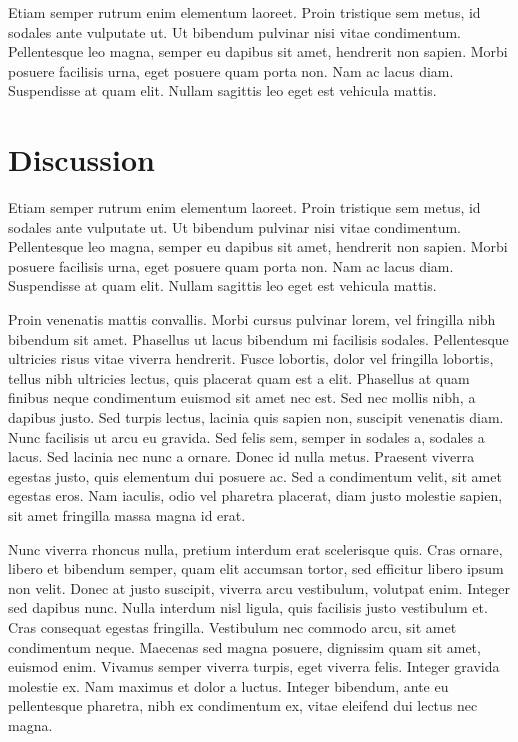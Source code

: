 Etiam semper rutrum enim elementum laoreet. Proin tristique sem metus, id sodales ante vulputate ut. Ut bibendum pulvinar nisi vitae condimentum. Pellentesque leo magna, semper eu dapibus sit amet, hendrerit non sapien. Morbi posuere facilisis urna, eget posuere quam porta non. Nam ac lacus diam. Suspendisse at quam elit. Nullam sagittis leo eget est vehicula mattis. 

\section{Discussion}

 Etiam semper rutrum enim elementum laoreet. Proin tristique sem metus, id sodales ante vulputate ut. Ut bibendum pulvinar nisi vitae condimentum. Pellentesque leo magna, semper eu dapibus sit amet, hendrerit non sapien. Morbi posuere facilisis urna, eget posuere quam porta non. Nam ac lacus diam. Suspendisse at quam elit. Nullam sagittis leo eget est vehicula mattis.

Proin venenatis mattis convallis. Morbi cursus pulvinar lorem, vel fringilla nibh bibendum sit amet. Phasellus ut lacus bibendum mi facilisis sodales. Pellentesque ultricies risus vitae viverra hendrerit. Fusce lobortis, dolor vel fringilla lobortis, tellus nibh ultricies lectus, quis placerat quam est a elit. Phasellus at quam finibus neque condimentum euismod sit amet nec est. Sed nec mollis nibh, a dapibus justo. Sed turpis lectus, lacinia quis sapien non, suscipit venenatis diam. Nunc facilisis ut arcu eu gravida. Sed felis sem, semper in sodales a, sodales a lacus. Sed lacinia nec nunc a ornare. Donec id nulla metus. Praesent viverra egestas justo, quis elementum dui posuere ac. Sed a condimentum velit, sit amet egestas eros. Nam iaculis, odio vel pharetra placerat, diam justo molestie sapien, sit amet fringilla massa magna id erat.

Nunc viverra rhoncus nulla, pretium interdum erat scelerisque quis. Cras ornare, libero et bibendum semper, quam elit accumsan tortor, sed efficitur libero ipsum non velit. Donec at justo suscipit, viverra arcu vestibulum, volutpat enim. Integer sed dapibus nunc. Nulla interdum nisl ligula, quis facilisis justo vestibulum et. Cras consequat egestas fringilla. Vestibulum nec commodo arcu, sit amet condimentum neque. Maecenas sed magna posuere, dignissim quam sit amet, euismod enim. Vivamus semper viverra turpis, eget viverra felis. Integer gravida molestie ex. Nam maximus et dolor a luctus. Integer bibendum, ante eu pellentesque pharetra, nibh ex condimentum ex, vitae eleifend dui lectus nec magna.





